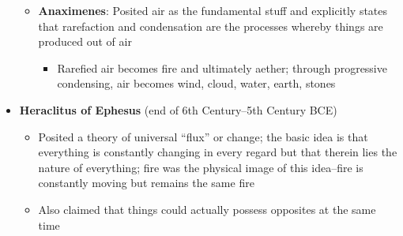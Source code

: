 \documentclass[11pt]{article}
\begin{document}
\begin{itemize}
\begin{itemize}
\item{\textbf{Anaximenes}: Posited air as the fundamental stuff and explicitly states that rarefaction and condensation are the processes whereby things are produced out of air}\begin{itemize}\item{Rarefied air becomes fire and ultimately aether; through progressive condensing, air becomes wind, cloud, water, earth, stones}\end{itemize}\end{itemize}

\item{\textbf{Heraclitus of Ephesus} (end of 6th Century--5th Century BCE)}

\begin{itemize}\item{Posited a theory of universal ``flux'' or change; the basic idea is that everything is constantly changing in every regard but that therein lies the nature of everything; fire was the physical image of this idea--fire is constantly moving but remains the same fire}\item{Also claimed that things could actually possess opposites at the same time}\end{itemize}\end{itemize}
\end{document}
